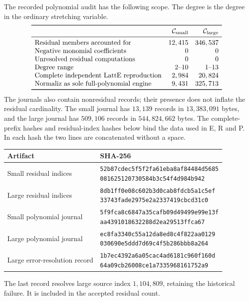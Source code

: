 \documentclass[11pt]{article}
\begin{document}
The recorded polynomial audit has the following scope. The degree is
the degree in the ordinary stretching variable.
\[
\begin{array}{lrr}
\toprule
&\mathcal C_{\rm small}&\mathcal C_{\rm large}\\
\midrule
\text{Residual members accounted for}&12,415&346,537\\
\text{Negative monomial coefficients}&0&0\\
\text{Unresolved residual computations}&0&0\\
\text{Degree range}&2\text{--}10&1\text{--}13\\
\text{Complete independent LattE reproduction}&2,984&20,824\\
\text{Normaliz as sole full-polynomial engine}&9,431&325,713\\
\bottomrule
\end{array}
\]
The journals also contain nonresidual records; their presence does not
inflate the residual cardinality. The small journal has $13,139$ records
in $13,383,091$ bytes, and the large journal has $509,106$ records in
$544,824,662$ bytes. The complete-prefix hashes and residual-index hashes
below bind the data used in E, R and P. In each hash the two lines are
concatenated without a space.
\begin{center}
\small
\begin{tabular}{ll}
\toprule
Artifact&SHA-256\\
\midrule
Small residual indices&\shortstack[l]{\texttt{52b87cdec5f5f2fa61eba8af84484d5685}\\
\texttt{081625120730584b3c54f4d984b942}}\\
Large residual indices&\shortstack[l]{\texttt{8db1ff0e08c602b3d0cab8fdcb5a1c5ef}\\
\texttt{33743fade2975e2a2337419cbcd31c0}}\\
Small polynomial journal&\shortstack[l]{\texttt{5f9fca8c6847a35cafb09d49499e99e13f}\\
\texttt{aa4391018632288d2ea29513ffca67}}\\
Large polynomial journal&\shortstack[l]{\texttt{ec8fa3340c55a12da8ed8c4f822aa0129}\\
\texttt{030690e5ddd7d69c4f5b286bbb8a264}}\\
Large error-resolution record&\shortstack[l]{\texttt{1b7ec4392a6a05cac4ad6181c960f160d}\\
\texttt{64a09cb26008ce1a7335968161752a9}}\\
\bottomrule
\end{tabular}
\end{center}
The last record resolves large source index $1,104,809$, retaining the
historical failure. It is included in the accepted residual count.
\end{document}
